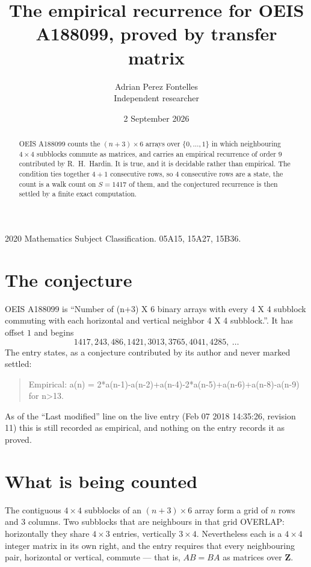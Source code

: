 \documentclass[11pt,a4paper]{article}
\title{The empirical recurrence for OEIS A188099, proved by transfer matrix}
\author{Adrian Perez Fontelles\\ \small Independent researcher}
\date{2 September 2026}
\theoremstyle{plain}
\theoremstyle{definition}
\begin{document}
\maketitle

\begin{abstract}
OEIS A188099 counts the $(n+3)\times6$ arrays over $\{0,\dots,1\}$ in which
neighbouring $4\times4$ subblocks commute as matrices, and carries an empirical
recurrence
of order $9$ contributed by R.~H.~Hardin. It is true, and it is decidable rather than
empirical. The condition ties together $4+1$ consecutive rows, so $4$ consecutive rows are
a state, the count is a walk count on $S=1417$ of them, and the conjectured recurrence is then
settled by a finite exact computation.
\end{abstract}

\noindent\small 2020 Mathematics Subject Classification. 05A15, 15A27, 15B36.\normalsize

\section{The conjecture}

OEIS A188099 is ``Number of (n+3) X 6 binary arrays with every 4 X 4 subblock commuting with each horizontal and vertical neighbor 4 X 4 subblock.''. It has offset $1$ and begins
\[
1417, 243, 486, 1421, 3013, 3765, 4041, 4285,\ \dots
\]
The entry states, as a conjecture contributed by its author and never marked settled:
\begin{quote}
Empirical: a(n) = 2*a(n-1)-a(n-2)+a(n-4)-2*a(n-5)+a(n-6)+a(n-8)-a(n-9) for n>13.
\end{quote}
As of the ``Last modified'' line on the live entry (Feb 07 2018 14:35:26, revision 11) this is still
recorded as empirical, and nothing on the entry records it as proved.

\section{What is being counted}

The contiguous $4\times4$ subblocks of an $(n+3)\times6$ array form a grid of $n$
rows and $3$ columns. Two subblocks that are neighbours in that
grid OVERLAP: horizontally they share $4\times3$ entries, vertically
$3\times4$. Nevertheless each is a $4\times4$ integer matrix in its own right, and
the entry requires that every neighbouring pair, horizontal or vertical, commute --- that is,
$AB=BA$ as matrices over $\mathbf{Z}$.
\end{document}
